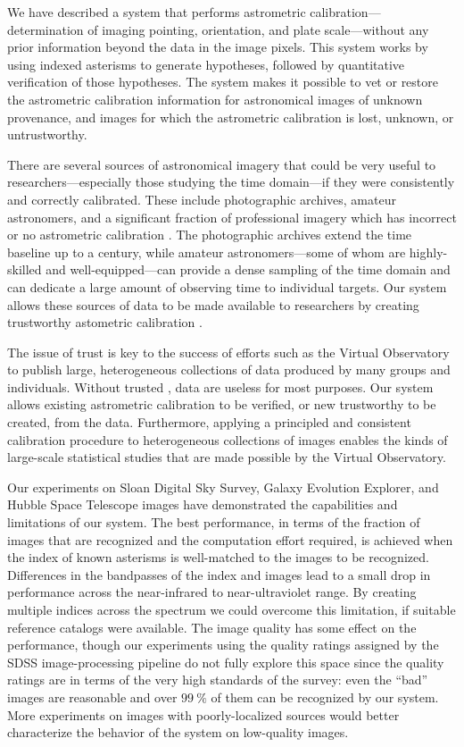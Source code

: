 We have described a system that performs astrometric
calibration---determination of imaging pointing, orientation, and
plate scale---without any prior information beyond the data
in the image pixels.  This system works by using indexed asterisms to
generate hypotheses, followed by quantitative verification of those
hypotheses.  The system makes it possible to vet or restore the
astrometric calibration information for astronomical images of unknown
provenance, and images for which the astrometric calibration is lost,
unknown, or untrustworthy.


There are several sources of astronomical imagery that could be very
useful to \linebreak[4] researchers---especially those studying the
time domain---if they were consistently and correctly calibrated.
These include photographic archives, amateur astronomers, and a
significant fraction of professional imagery which has incorrect or no
astrometric calibration \metadata.  The photographic archives extend
the time baseline up to a century, while amateur astronomers---some of
whom are highly-skilled and well-equipped---can provide a dense
sampling of the time domain and can dedicate a large amount of
observing time to individual targets.  Our system allows these sources
of data to be made available to researchers by creating trustworthy
astometric calibration \metadata.


The issue of trust is key to the success of efforts such as the
Virtual Observatory to publish large, heterogeneous collections of data
produced by many groups and individuals.  Without trusted \metadata,
data are useless for most purposes.  Our system allows existing
astrometric calibration \metadata to be verified, or new
trustworthy \metadata to be created, from the data.  Furthermore,
applying a principled and consistent calibration procedure to
heterogeneous collections of images enables the kinds of large-scale
statistical studies that are made possible by the Virtual Observatory.


Our experiments on Sloan Digital Sky Survey, Galaxy Evolution
Explorer, and Hubble Space Telescope images have demonstrated the
capabilities and limitations of our system.  The best performance, in
terms of the fraction of images that are recognized and the
computation effort required, is achieved when the index of known
asterisms is well-matched to the images to be recognized.  Differences
in the bandpasses of the index and images lead to a small drop in
performance across the near-infrared to near-ultraviolet range.  By
creating multiple indices across the spectrum we could overcome this
limitation, if suitable reference catalogs were available.  The image
quality has some effect on the performance, though our experiments
using the quality ratings assigned by the SDSS image-processing
pipeline do not fully explore this space since the quality ratings are
in terms of the very high standards of the survey: even the ``bad''
images are reasonable and over $99~\percent$ of them can be recognized
by our system.  More experiments on images with poorly-localized
sources would better characterize the behavior of the system on
low-quality images.


